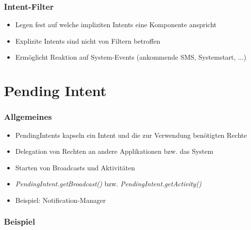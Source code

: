 \begin{frame}
   \frametitle{Intent-Filter}
   \begin{itemize}
      \item Legen fest auf welche impliziten Intents eine Komponente anspricht
      \item Explizite Intents sind nicht von Filtern betroffen
      \item Ermöglicht Reaktion auf System-Events (ankommende SMS, Systemstart, ...)
   \end{itemize}

   
\end{frame}

\section{Pending Intent}
\begin{frame}
   \frametitle{Allgemeines}
   \begin{itemize}
      \item PendingIntents kapseln ein Intent und die zur Verwendung benötigten Rechte
      \item Delegation von Rechten an andere Applikationen bzw. das System
      \item Starten von Broadcasts und Aktivitäten 
      \item \emph{PendingIntent.getBroadcast()} bzw. \emph{PendingIntent.getActivity()} 
      \item Beispiel: Notification-Manager
   \end{itemize}
\end{frame}

\begin{frame}
   \frametitle{Beispiel}
	
\end{frame}


